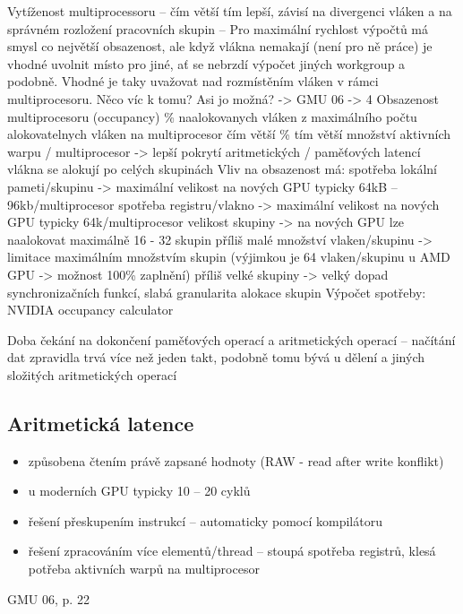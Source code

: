 	Vytíženost multiprocessoru – čím větší tím lepší, závisí na divergenci vláken a na správném rozložení pracovních skupin
	-- Pro maximální rychlost výpočtů má smysl co největší obsazenost, ale když vlákna nemakají (není pro ně práce) je vhodné uvolnit místo pro jiné, ať se nebrzdí výpočet jiných workgroup a podobně. Vhodné je taky uvažovat nad rozmístěním vláken v rámci multiprocesoru.
	Něco víc k tomu? Asi jo možná?
	-> GMU 06 -> 4
	Obsazenost multiprocesoru (occupancy)
	\% naalokovanych vláken z maximálního počtu
	alokovatelnych vláken na multiprocesor
	čím větší \% tím větší množství aktivních warpu /
	multiprocesor -> lepší pokrytí aritmetických / paměťových
	latencí
	vlákna se alokují po celých skupinách
	Vliv na obsazenost má:
	spotřeba lokální pameti/skupinu -> maximální velikost na
	nových GPU typicky 64kB -- 96kb/multiprocesor
	spotřeba registru/vlakno -> maximální velikost na nových
	GPU typicky 64k/multiprocesor
	velikost skupiny -> na nových GPU lze naalokovat
	maximálně 16 - 32 skupin
	příliš malé množství vlaken/skupinu -> limitace maximálním
	množstvím skupin (výjimkou je 64 vlaken/skupinu u AMD GPU -> možnost 100\% zaplnění)
	příliš velké skupiny -> velký dopad synchronizačních funkcí,
	slabá granularita alokace skupin
	Výpočet spotřeby: NVIDIA occupancy calculator


	Doba čekání na dokončení paměťových operací a aritmetických operací – načítání dat zpravidla trvá více než jeden takt, podobně tomu bývá u dělení a jiných složitých aritmetických operací
	
	\subsection*{Aritmetická latence}
	\begin{itemize}
		\setlength\itemsep{0em}
		\item způsobena čtením právě zapsané hodnoty (RAW - read after write konflikt)
		\item u moderních GPU typicky 10 -- 20 cyklů
		\item řešení přeskupením instrukcí -- automaticky pomocí kompilátoru
		\item řešení zpracováním více elementů/thread -- stoupá spotřeba registrů, klesá potřeba aktivních warpů na multiprocesor
	\end{itemize}


	GMU 06, p. 22
	

